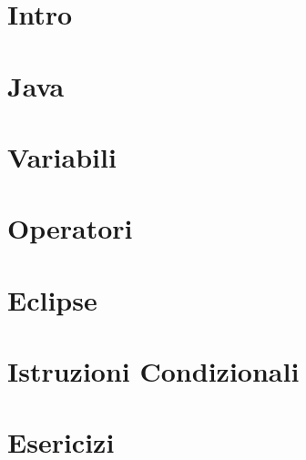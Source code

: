 \documentclass[10pt]{beamer}
\begin{document}


\section{Intro}


\section{Java}

 
\section{Variabili}


\section{Operatori}

 
\section{Eclipse}


\section{Istruzioni Condizionali}


\section{Esericizi}


% 
\end{document}

